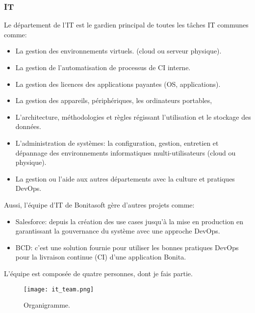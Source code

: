 \subsubsection{IT}
Le département de l'IT est le gardien principal de toutes les tâches IT communes comme:
\begin{itemize}
  \item La gestion des environnements virtuels. (cloud ou serveur physique).
  \item La gestion de l'automatisation de processus de CI interne.
  \item La gestion des licences des applications payantes (OS, applications).
  \item La gestion des appareils, périphériques, les ordinateurs portables,
  \item L'architecture, méthodologies et règles régissant l'utilisation et le stockage des données.
  \item L'administration de systèmes: la configuration, gestion, entretien et dépannage des environnements
  informatiques multi-utilisateurs (cloud ou physique).
  \item  La gestion ou l'aide aux autres départements avec la culture et pratiques DevOps.
\end{itemize}

Aussi, l'équipe d'IT de Bonitasoft gère d'autres projets comme:
\begin{itemize}
  \item Salesforce: depuis la création des use cases jusqu'à la mise en production en garantissant la gouvernance du système avec une approche DevOps.
  \item BCD: c'est une solution fournie pour utiliser les bonnes pratiques DevOps pour la livraison continue (CI) d'une application Bonita.
\end{itemize}

L'équipe est composée de quatre personnes, dont je fais partie.

\begin{figure}[h]
  \texttt{[image: it\_team.png]}
   \caption{Organigramme.}
   \label{figure:organigrame}
\end{figure}
